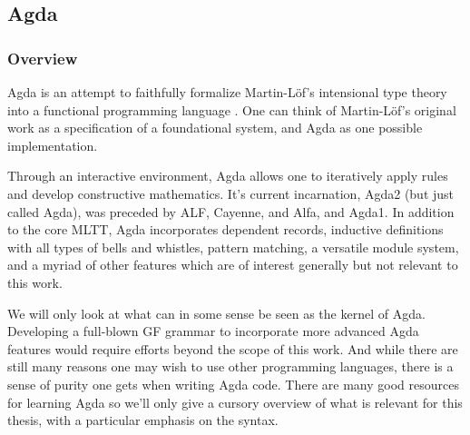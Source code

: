 \subsection{Agda}

\subsubsection{Overview}

Agda is an attempt to faithfully formalize Martin-Löf's intensional type theory
\cite{ml1984} into a functional programming language . One can think of
Martin-Löf's original work as a specification of a foundational system, and Agda
as one possible implementation.

Through an interactive environment, Agda allows one to iteratively apply rules
and develop constructive mathematics. It's current incarnation, Agda2 (but just
called Agda), was preceded by ALF, Cayenne, and Alfa, and Agda1. In addition to
the core MLTT, Agda incorporates dependent records, inductive definitions with
all types of bells and whistles, pattern matching, a versatile module system,
and a myriad of other features which are of interest generally but not relevant
to this work.

We will only look at what can in some sense be seen as the kernel of Agda.
Developing a full-blown GF grammar to incorporate more advanced Agda features
would require efforts beyond the scope of this work. And while there are still
many reasons one may wish to use other programming languages, there is a sense
of purity one gets when writing Agda code. There are many good resources for
learning Agda \cite{Bove2009} \cite{stump} \cite{ulf} \cite{wadler} so we'll
only give a cursory overview of what is relevant for this thesis, with a
particular emphasis on the syntax.





